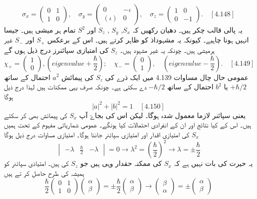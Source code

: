 \documentclass{book}
\begin{document}
$$ \sigma_{x}=\left(\begin{matrix} 0&1 \\ 1&0 \end{matrix}\right), \quad \sigma_{y}= \left(\begin{matrix} 0&-\iota \\ (\iota)&0 \end{matrix}\right), \quad \sigma_{z}=\left(\begin{matrix} 1&0 \\ 0&-1 \end{matrix}\right). \quad [4.148] $$
یہ پالی قالب چکر ہیں۔ دھیان رکھیں کہ $ S_{x} $, $ S_{y} $ , $ S_{z} $  اور $ S^2 $ تمام ہر میشی ہیں۔ جیسا انہیں ہونا چاہیے۔ کیونکہ یہ مشہوداذ کو ظاہر کرتے ہیں۔ اس کے برعکس $ S_{+} $ اور  $ S_{-} $ غیر ہرمیشی ہیں۔ چونکہ یہ غیر مشہود ہیں۔ $ S_{z} $  کی امتیازی سپائنرز درج ذیل ہوں گے
$$ \chi_{+}= \left(\begin{matrix} 1 \\ 0 \end{matrix}\right),(eigenvalue+\frac{\hbar}{2}); \quad \chi_{-}=\left(\begin{matrix} 0 \\ 1 \end{matrix}\right), \quad (eigenvalue-\frac{\hbar}{2}). \quad [4.149] $$
عمومی حال چال مساوات 4.139 میں ایک ذرے کی $ S_{z} $ کی پیمائش  $ a^2 $ احتمال کے ساتھ $ +\hbar/2 $ یا  $ b^2 $ احتمال کے ساتھ $ -\hbar/2  $ دے سکتی ہے۔ چونکہ صرف یہی ممکنات ہیں لہذا درج ذیل ہوگا
$$ |a|^2+|b|^2=1 \quad[4.150] $$
یعنی سپائنر لازما معمول شدہ ہوگا۔
لیکن اس کی بجاۓ آپ $ S_{x} $ کی پیمائش بھی کر سکتے ہیں۔ اس کے کیا نتائج اور ان کے انفرادی احتمالات کیا ہونگے۔ عمومی شماریاتی مفہوم کے تحت ہمیں 
$ S_{x} $ 
کی امتیازی اقدار اور امتیازی سپائنر جاننا ہوگا۔ امتیازی مساوات درج ذیل ہوگا
$$ \begin{vmatrix} -\lambda & \frac{\hbar}{2} & -\lambda \end{vmatrix}=0 \rightarrow \lambda^2=(\frac{\hbar}{2})^2\rightarrow\lambda={\pm}\frac{\hbar}{2} $$
یہ حیرت کی بات نہیں ہے کہ
 $ S_{x} $ 
 کی ممکنہ حقدار وہی ہیں جو
  $ S_{z} $ 
 کی ہیں۔ امتیاذی سپائنر کو ہمیشہ کی طرح حاصل کر تے ہیں
$$ \frac{\hbar}{2}\begin{pmatrix}0&1 \\ 1&0 \end{pmatrix} \begin{pmatrix} \alpha \\ \beta \end{pmatrix}= {\pm}\frac{\hbar}{2}\begin{pmatrix}\alpha \\ \beta \end{pmatrix} \rightarrow \begin{pmatrix}\beta \\ \alpha \end{pmatrix} ={\pm} \begin{pmatrix}\alpha \\ \beta \end{pmatrix} $$ 
\end{document}
